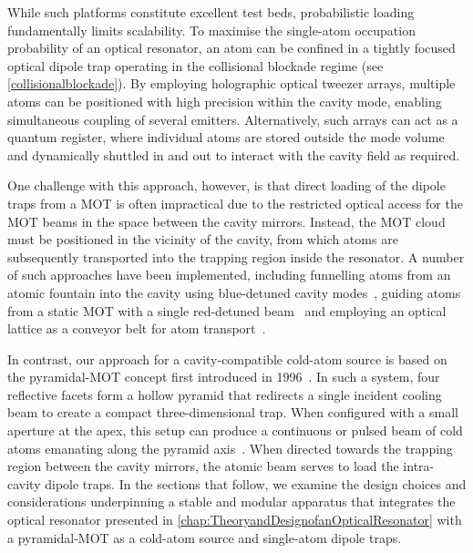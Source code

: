 \documentclass[../Thesis-IJspeert.tex]{subfiles}
\begin{document}
While such platforms constitute excellent test beds, probabilistic loading fundamentally limits scalability. To maximise the single-atom occupation probability of an optical resonator, an atom can be confined in a tightly focused optical dipole trap operating in the collisional blockade regime (see \autoref{collisionalblockade}). By employing holographic optical tweezer arrays, multiple atoms can be positioned with high precision within the cavity mode, enabling simultaneous coupling of several emitters. Alternatively, such arrays can act as a quantum register, where individual atoms are stored outside the mode volume and dynamically shuttled in and out to interact with the cavity field as required.

One challenge with this approach, however, is that direct loading of the dipole traps from a MOT is often impractical due to the restricted optical access for the MOT beams in the space between the cavity mirrors. Instead, the MOT cloud must be positioned in the vicinity of the cavity, from which atoms are subsequently transported into the trapping region inside the resonator. A number of such approaches have been implemented, including funnelling atoms from an atomic fountain into the cavity using blue-detuned cavity modes~\cite{Puppe2007}, guiding atoms from a static MOT with a single red-detuned beam~\cite{Numann2005} and employing an optical lattice as a conveyor belt for atom transport~\cite{Gallego2018,Schrader2001}.

In contrast, our approach for a cavity-compatible cold-atom source is based on the pyramidal-MOT concept first introduced in 1996~\cite{Lee1996}. In such a system, four reflective facets form a hollow pyramid that redirects a single incident cooling beam to create a compact three-dimensional trap. When configured with a small aperture at the apex, this setup can produce a continuous or pulsed beam of cold atoms emanating along the pyramid axis~\cite{Arlt1998,Williamson1998}. When directed towards the trapping region between the cavity mirrors, the atomic beam serves to load the intra-cavity dipole traps. In the sections that follow, we examine the design choices and considerations underpinning a stable and modular apparatus that integrates the optical resonator presented in \autoref{chap:TheoryandDesignofanOpticalResonator} with a pyramidal-MOT as a cold-atom source and single-atom dipole traps.
\end{document}
